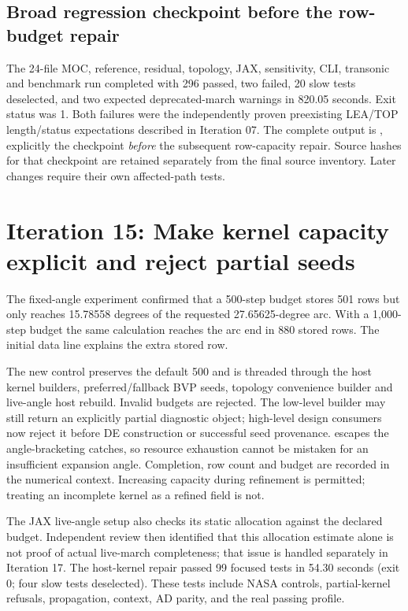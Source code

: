 \subsection{Broad regression checkpoint before the row-budget repair}
The 24-file MOC, reference, residual, topology, JAX, sensitivity, CLI,
transonic and benchmark run completed with 296 passed, two failed,
20 slow tests deselected, and two expected deprecated-march warnings
in 820.05 seconds. Exit status was 1. Both failures were the independently
proven preexisting LEA/TOP length/status expectations described in
Iteration 07. The complete output is
, explicitly the checkpoint
\emph{before} the subsequent row-capacity repair.
Source hashes for that checkpoint are retained separately from the final
source inventory. Later changes require their own affected-path tests.

\section{Iteration 15: Make kernel capacity explicit and reject partial seeds}
The fixed-angle experiment confirmed that a 500-step budget stores 501 rows
but only reaches 15.78558 degrees of the requested 27.65625-degree arc.
With a 1,000-step budget the same calculation reaches the arc end in 880
stored rows. The initial data line explains the extra stored row.

The new  control preserves the default 500 and
is threaded through the host kernel builders, preferred/fallback BVP seeds,
topology convenience builder and live-angle host rebuild. Invalid budgets
are rejected. The low-level builder may still return an explicitly partial
diagnostic object; high-level design consumers now reject it before DE
construction or successful seed provenance. 
escapes the angle-bracketing catches, so resource exhaustion cannot be
mistaken for an insufficient expansion angle. Completion, row count and
budget are recorded in the numerical context. Increasing capacity during
refinement is permitted; treating an incomplete kernel as a refined field is not.

The JAX live-angle setup also checks its static allocation against the
declared budget. Independent review then identified that this allocation
estimate alone is not proof of actual live-march completeness; that issue
is handled separately in Iteration 17. The host-kernel repair passed
99 focused tests in 54.30 seconds (exit 0; four slow
tests deselected). These tests include NASA controls, partial-kernel
refusals, propagation, context, AD parity, and the real passing profile.


